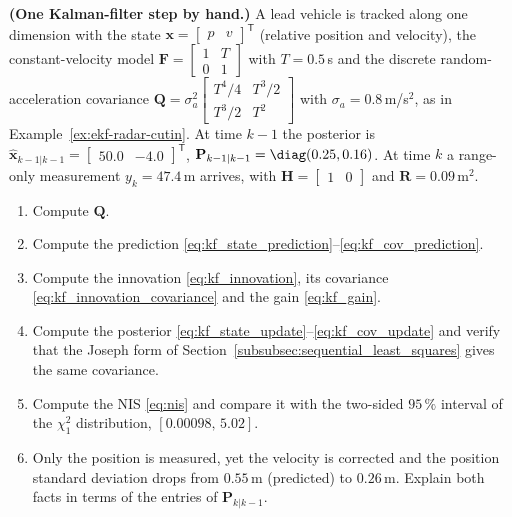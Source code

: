\begin{prob}\label{prob:ch03:4}
\textbf{(One Kalman-filter step by hand.)} A lead vehicle is tracked along one dimension with the state $\mathbf{x}=\begin{bmatrix}p&v\end{bmatrix}^{\mathsf T}$ (relative position and velocity), the constant-velocity model $\mathbf{F}=\begin{bmatrix}1&T\\0&1\end{bmatrix}$ with $T=0.5$\,s and the discrete random-acceleration covariance $\mathbf{Q}=\sigma_a^{2}\begin{bmatrix}T^{4}/4&T^{3}/2\\T^{3}/2&T^{2}\end{bmatrix}$ with $\sigma_a=0.8$\,m/s$^{2}$, as in Example~\ref{ex:ekf-radar-cutin}. At time $k-1$ the posterior is $\widehat{\mathbf{x}}_{k-1|k-1}=\begin{bmatrix}50.0&-4.0\end{bmatrix}^{\mathsf T}$, $\mathbf{P}_{k-1|k-1}=\diag(0.25,0.16)$. At time $k$ a range-only measurement $y_k=47.4$\,m arrives, with $\mathbf{H}=\begin{bmatrix}1&0\end{bmatrix}$ and $\mathbf{R}=0.09$\,m$^{2}$.
\begin{enumerate}
\item[(a)] Compute $\mathbf{Q}$.
\item[(b)] Compute the prediction \eqref{eq:kf_state_prediction}--\eqref{eq:kf_cov_prediction}.
\item[(c)] Compute the innovation \eqref{eq:kf_innovation}, its covariance \eqref{eq:kf_innovation_covariance} and the gain \eqref{eq:kf_gain}.
\item[(d)] Compute the posterior \eqref{eq:kf_state_update}--\eqref{eq:kf_cov_update} and verify that the Joseph form of Section~\ref{subsubsec:sequential_least_squares} gives the same covariance.
\item[(e)] Compute the NIS \eqref{eq:nis} and compare it with the two-sided $95\,\%$ interval of the $\chi^{2}_{1}$ distribution, $[0.00098,\,5.02]$.
\item[(f)] Only the position is measured, yet the velocity is corrected and the position standard deviation drops from $0.55$\,m (predicted) to $0.26$\,m. Explain both facts in terms of the entries of $\mathbf{P}_{k|k-1}$.
\end{enumerate}
\end{prob}

